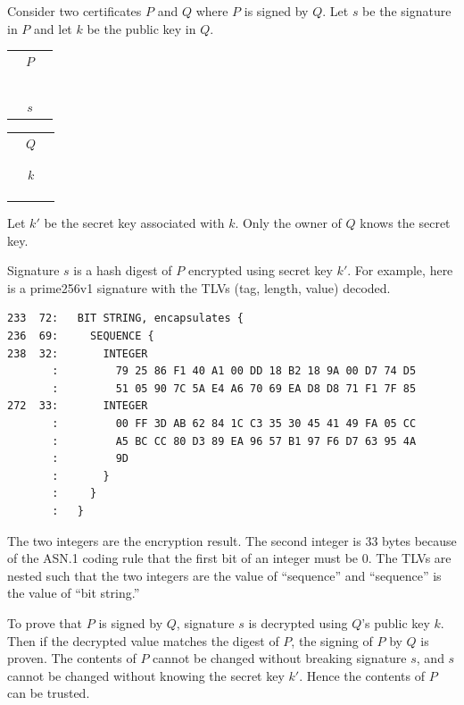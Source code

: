 \documentclass[12pt]{article}
\begin{document}
Consider two certificates $P$ and $Q$ where $P$ is signed by $Q$.
Let $s$ be the signature in $P$ and let $k$ be the public
key in $Q$.

\begin{center}
\begin{tabular}{|c|}
\hline
$\quad P\quad$\\
\\
\\
\\
\\
\\
\hline
$s$\\
\hline
\end{tabular}
\qquad
\begin{tabular}{|c|}
\hline
$\quad Q\quad$\\
\\
\\
\hline
$k$\\
\hline
\\
\\
\\
\hline
\end{tabular}
\end{center}

Let $k'$ be the secret key associated with $k$.
Only the owner of $Q$ knows the secret key.

Signature $s$ is a hash digest of $P$ encrypted using secret key $k'$.
For example, here is a prime256v1 signature
with the TLVs (tag, length, value) decoded.

{\scriptsize
\begin{verbatim}
233  72:   BIT STRING, encapsulates {
236  69:     SEQUENCE {
238  32:       INTEGER
       :         79 25 86 F1 40 A1 00 DD 18 B2 18 9A 00 D7 74 D5
       :         51 05 90 7C 5A E4 A6 70 69 EA D8 D8 71 F1 7F 85
272  33:       INTEGER
       :         00 FF 3D AB 62 84 1C C3 35 30 45 41 49 FA 05 CC
       :         A5 BC CC 80 D3 89 EA 96 57 B1 97 F6 D7 63 95 4A
       :         9D
       :       }
       :     }
       :   }
\end{verbatim}
}

The two integers are the encryption result.
The second integer is 33 bytes because of the ASN.1 coding rule that the first bit
of an integer must be 0.
The TLVs are nested such that the two integers are the value of ``sequence''
and ``sequence'' is the value of ``bit string.''

To prove that $P$ is signed by $Q$, signature $s$ is decrypted using $Q$'s public key $k$.
Then if the decrypted value matches the digest of $P$,
the signing of $P$ by $Q$ is proven.
The contents of $P$ cannot be changed without breaking signature $s$,
and $s$ cannot be changed without knowing the secret key $k'$.
Hence the contents of $P$ can be trusted.
\end{document}
